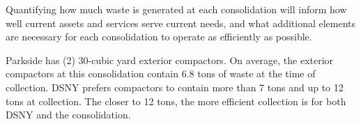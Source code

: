 
    Quantifying how much waste is generated at each consolidation will inform how well current assets and services serve current needs, and what additional elements are necessary for each consolidation to operate as efficiently as possible.
    
    Parkside has (2) 30-cubic yard exterior compactors. On average, the exterior compactors at this consolidation contain 6.8 tons of waste at the time of collection. DSNY prefers compactors to contain more than 7 tons and up to 12 tons at collection. The closer to 12 tons, the more efficient collection is for both DSNY and the consolidation.